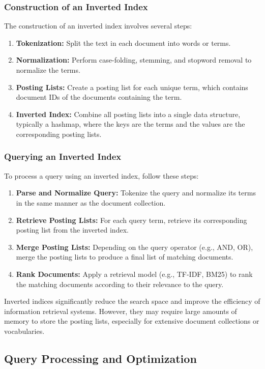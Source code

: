 \documentclass[12pt]{article}
\begin{document}
\subsubsection{Construction of an Inverted Index}
The construction of an inverted index involves several steps:
\begin{enumerate}
    \item \textbf{Tokenization:} Split the text in each document into words or terms.
    \item \textbf{Normalization:} Perform case-folding, stemming, and stopword removal to normalize the terms.
    \item \textbf{Posting Lists:} Create a posting list for each unique term, which contains document IDs of the documents containing the term.
    \item \textbf{Inverted Index:} Combine all posting lists into a single data structure, typically a hashmap, where the keys are the terms and the values are the corresponding posting lists.
\end{enumerate}

\subsubsection{Querying an Inverted Index}
To process a query using an inverted index, follow these steps:
\begin{enumerate}
    \item \textbf{Parse and Normalize Query:} Tokenize the query and normalize its terms in the same manner as the document collection.
    \item \textbf{Retrieve Posting Lists:} For each query term, retrieve its corresponding posting list from the inverted index.
    \item \textbf{Merge Posting Lists:} Depending on the query operator (e.g., AND, OR), merge the posting lists to produce a final list of matching documents.
    \item \textbf{Rank Documents:} Apply a retrieval model (e.g., TF-IDF, BM25) to rank the matching documents according to their relevance to the query.
\end{enumerate}
Inverted indices significantly reduce the search space and improve the efficiency of information retrieval systems. However, they may require large amounts of memory to store the posting lists, especially for extensive document collections or vocabularies.

\subsection{Query Processing and Optimization}
\label{sec:query_processing_optimization}
\end{document}

